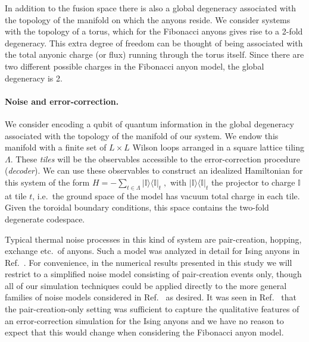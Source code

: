 \documentclass[aps, prl, letterpaper, twocolumn, superscriptaddress, notitlepage, 10pt]{revtex4-1}
\newcommand{\vac}{\mathbb{I}}
\newcommand{\ket}[1]{|{#1}\rangle}
\newcommand{\bra}[1]{\langle{#1}|}
\newcommand{\ketbra}[2]{\ket{#1}\!\bra{#2}}
\newcommand{\proj}[1]{\ketbra{#1}{#1}}
\begin{document}
In addition to the fusion space there is also a global degeneracy associated with the topology of the 
manifold on which the anyons reside. We consider systems with the topology of a torus, 
which for the Fibonacci anyons gives rise to a 2-fold degeneracy.
This extra degree of freedom can be thought of being associated with the total anyonic charge (or flux) running through the torus itself. Since there are two different possible charges in the Fibonacci anyon model, the global degeneracy is 2.

\paragraph{Noise and error-correction.}

We consider encoding a qubit of quantum information in the global degeneracy associated 
with the topology of the manifold of our system.
We endow this manifold with a finite set of $L\times L$ Wilson loops arranged in
a square lattice tiling $\Lambda$.
These \emph{tiles} will be the observables accessible to the error-correction procedure (\emph{decoder}).
We can use these observables to construct an idealized Hamiltonian for this system of the form
 $H=-\sum_{t\in \Lambda}\proj{\vac}_t\;,$ 
with $\proj{\vac}_t$ the projector to charge $\vac$ at tile $t$, i.e.~the ground 
space of the model has vacuum total charge in each tile.
Given the toroidal boundary 
conditions, this space contains the two-fold degenerate codespace.

Typical thermal noise processes in this kind of system are 
pair-creation, hopping, exchange etc.~of anyons. Such a model was analyzed in detail for Ising anyons in Ref.~\cite{Brell2013}.
For convenience, in the numerical results presented in this study we will restrict to a simplified noise model consisting of pair-creation events only, though all of our simulation techniques could be applied directly to the more general families of noise models considered in Ref.~\cite{Brell2013} as desired. It was seen in Ref.~\cite{Brell2013} that the pair-creation-only setting was sufficient to capture the qualitative features of an error-correction simulation for the Ising anyons and we have no reason to expect that this would change when considering the Fibonacci anyon model. 
\end{document}
